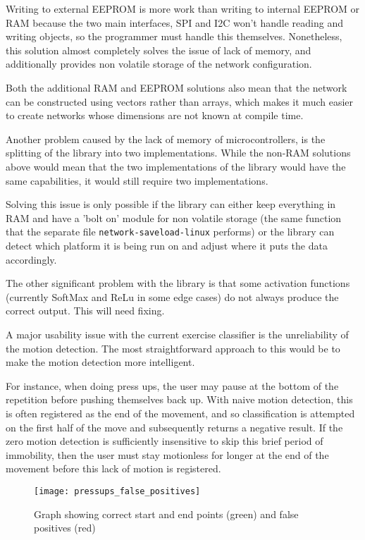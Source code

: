 \documentclass[a4paper]{article}
\begin{document}
Writing to external EEPROM is more work than writing to internal EEPROM or RAM because the two main interfaces, SPI and I2C won't handle reading and writing objects, so the programmer must handle this themselves. Nonetheless, this solution almost completely solves the issue of lack of memory, and additionally provides non volatile storage of the network configuration.

Both the additional RAM and EEPROM solutions also mean that the network can be constructed using vectors rather than arrays, which makes it much easier to create networks whose dimensions are not known at compile time. 

Another problem caused by the lack of memory of microcontrollers, is the splitting of the library into two implementations. While the non-RAM solutions above would mean that the two implementations of the library would have the same capabilities, it would still require two implementations.

Solving this issue is only possible if the library can either keep everything in RAM and have a 'bolt on' module for non volatile storage (the same function that the separate file \lstinline{network-saveload-linux} performs) or the library can detect which platform it is being run on and adjust where it puts the data accordingly. 

The other significant problem with the library is that some activation functions (currently SoftMax and ReLu in some edge cases) do not always produce the correct output. This will need fixing.

A major usability issue with the current exercise classifier is the unreliability of the motion detection. The most straightforward approach to this would be to make the motion detection more intelligent. 

For instance, when doing press ups, the user may pause at the bottom of the repetition before pushing themselves back up. With naive motion detection, this is often registered as the end of the movement, and so classification is attempted on the first half of the move and subsequently returns a negative result.
If the zero motion detection is sufficiently insensitive to skip this brief period of immobility, then the user must stay motionless for longer at the end of the movement before this lack of motion is registered.

\begin{figure}[H]
    \centering
        \texttt{[image: pressups\_false\_positives]}
        \caption{Graph showing correct start and end points (green) and false positives (red)}
        \label{fig:pu_false_positive}
\end{figure}
\end{document}
